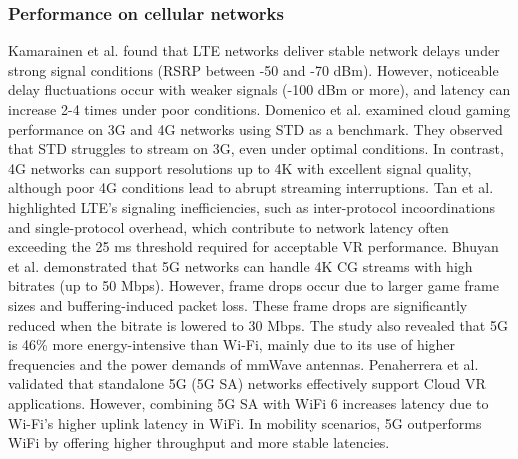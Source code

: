 \subsubsection{Performance on cellular networks}
Kamarainen et al. \cite{Kmrinen2017AMS} found that LTE networks deliver stable network delays under strong signal conditions (RSRP between -50 and -70 dBm). However, noticeable delay fluctuations occur with weaker signals (-100 dBm or more), and latency can increase 2-4 times under poor conditions.
Domenico et al. \cite{Domenico2021ANA} examined cloud gaming performance on 3G and 4G networks using \ac{STD} as a benchmark. They observed that STD struggles to stream on 3G, even under optimal conditions. In contrast, 4G networks can support resolutions up to 4K with excellent signal quality, although poor 4G conditions lead to abrupt streaming interruptions.
Tan et al. \cite{tan2018supporting} highlighted LTE’s signaling inefficiencies, such as inter-protocol incoordinations and single-protocol overhead, which contribute to network latency often exceeding the 25 ms threshold required for acceptable VR performance.
Bhuyan et al. \cite{bhuyan2022end} demonstrated that 5G networks can handle 4K CG streams with high bitrates (up to 50 Mbps). However, frame drops occur due to larger game frame sizes and buffering-induced packet loss. These frame drops are significantly reduced when the bitrate is lowered to 30 Mbps. The study also revealed that 5G is 46\% more energy-intensive than Wi-Fi, mainly due to its use of higher frequencies and the power demands of mmWave antennas.
Penaherrera et al. \cite{penaherrera2024cloud} validated that standalone 5G (5G SA) networks effectively support Cloud VR applications. However, combining 5G SA with WiFi 6 increases latency due to Wi-Fi's higher uplink latency in WiFi. In mobility scenarios, 5G outperforms WiFi by offering higher throughput and more stable latencies.


